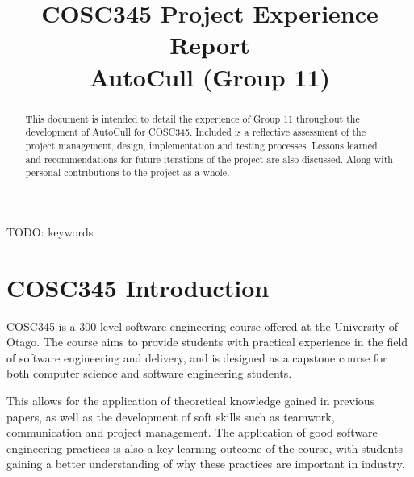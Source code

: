 \documentclass[conference]{IEEEtran}
\begin{document}
\title{COSC345 Project Experience Report\\
{\footnotesize AutoCull (Group 11)}
}

\author{
\and
{}
\and
{}
\and
{}
\and
{}
}

\maketitle

\begin{abstract}
This document is intended to detail the experience of Group 11 throughout the development of AutoCull for COSC345. Included is a reflective assessment of the project management, design, implementation and testing processes. Lessons learned and recommendations for future iterations of the project are also discussed. Along with personal contributions to the project as a whole.

\end{abstract}

\begin{IEEEkeywords}
TODO: keywords
\end{IEEEkeywords}

\section{COSC345 Introduction}
COSC345 is a 300-level software engineering course offered at the University of Otago. The course aims to provide students with practical experience in the field of software engineering and delivery, and is designed as a capstone course for both computer science and software engineering students.

This allows for the application of theoretical knowledge gained in previous papers, as well as the development of soft skills such as teamwork, communication and project management. The application of good software engineering practices is also a key learning outcome of the course, with students gaining a better understanding of why these practices are important in industry.
\end{document}
